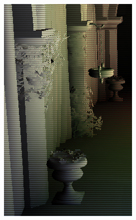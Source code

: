 \begin{figure}[htb]
\begin{subfigure}[b]{0.20\textwidth}
        \includegraphics[width=.95\textwidth]{screenshots/interleaved_horizontal_blur}%
        \caption{}
        \label{fig:results:interleaved_horizontal_blur}%
    \end{subfigure}%
    \begin{subfigure}[b]{0.20\textwidth}
        \centering

\end{subfigure}
\end{figure}
